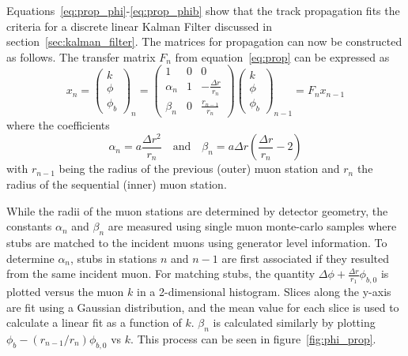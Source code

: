 Equations~\ref{eq:prop_phi}-\ref{eq:prop_phib} show that the track propagation fits the criteria for a discrete linear Kalman Filter discussed in section~\ref{sec:kalman_filter}. The matrices for propagation can now be constructed as follows. The transfer matrix $F_n$ from equation~\ref{eq:prop} can be expressed as
\begin{equation}
	\label{eq:kmtfProp}
	x_{n}=\left(\begin{matrix}
		k\\
		\phi\\
		\phi_b
	\end{matrix}\right)_{n} = 
\left(\begin{matrix}
	1 & 0 & 0\\
	\alpha_n & 1 & -\frac{\Delta r}{r_n}\\
	\beta_n & 0 & \frac{r_{n-1}}{r_n}
\end{matrix}\right)
\left(\begin{matrix}
	k\\
	\phi\\
	\phi_b
\end{matrix}\right)_{n-1}=F_nx_{n-1}
\end{equation}
where the coefficients
\begin{equation}
	\label{eq:kmtf_coeff}
	\alpha_n=a\frac{\Delta r^2}{r_n} \quad \mathrm{and} \quad \beta_n=a\Delta r\left(\frac{\Delta r}{r_n}-2\right)
\end{equation}
with $r_{n-1}$ being the radius of the previous (outer) muon station and $r_n$ the radius of the sequential (inner) muon station.

While the radii of the muon stations are determined by detector geometry, the constants $\alpha_n$ and $\beta_n$ are measured using single muon monte-carlo samples where stubs are matched to the incident muons using generator level information. To determine $\alpha_n$, stubs in stations $n$ and $n-1$ are first associated if they resulted from the same incident muon. For matching stubs, the quantity $\Delta\phi+\frac{\Delta r}{r_1}\phi_{b,0}$ is plotted versus the muon $k$ in a 2-dimensional histogram. Slices along the y-axis are fit using a Gaussian distribution, and the mean value for each slice is used to calculate a linear fit as a function of $k$. $\beta_n$ is calculated similarly by plotting $\phi_b-\left(r_{n-1}/r_n\right)\phi_{b,0}$ vs $k$. This process can be seen in figure~\ref{fig:phi_prop}.


